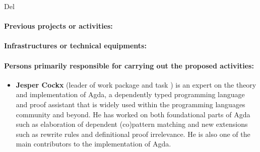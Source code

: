 \begin{sitedescription}{Del}

\paragraph{Previous projects or activities:}

\paragraph{Infrastructures or technical equipments:}

\paragraph{Persons primarily responsible for carrying out the proposed activities:}

\begin{itemize}

  \item{\bf Jesper Cockx} (leader of work package 
  and task ) is an expert on the theory and
  implementation of Agda, a dependently typed programming language and
  proof assistant that is widely used within the programming languages
  community and beyond. He has worked on both foundational parts of
  Agda such as elaboration of dependent (co)pattern matching and new
  extensions such as rewrite rules and definitional proof
  irrelevance. He is also one of the main contributors to the
  implementation of Agda.

\end{itemize}




\end{sitedescription}


